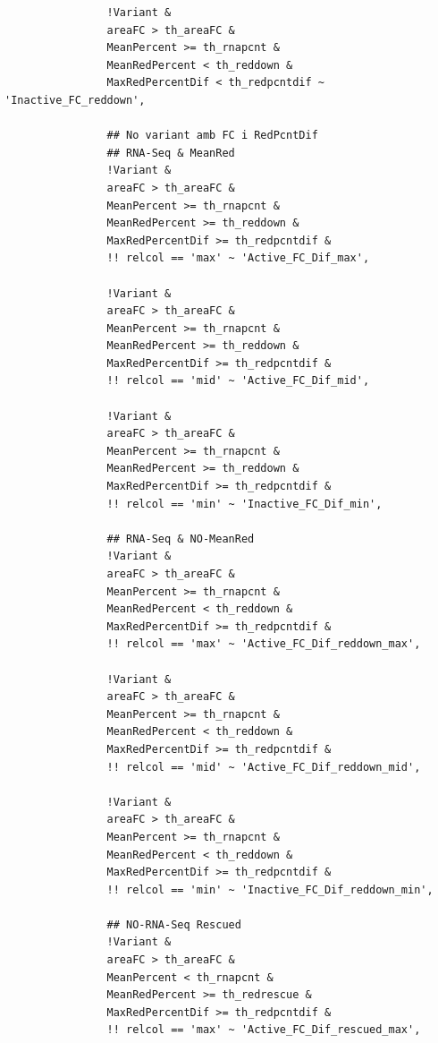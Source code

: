 \documentclass[11pt]{article}
\begin{document}
\begin{verbatim}
                !Variant &
                areaFC > th_areaFC &
                MeanPercent >= th_rnapcnt &
                MeanRedPercent < th_reddown &
                MaxRedPercentDif < th_redpcntdif ~ 'Inactive_FC_reddown',

                ## No variant amb FC i RedPcntDif
                ## RNA-Seq & MeanRed
                !Variant &
                areaFC > th_areaFC &
                MeanPercent >= th_rnapcnt &
                MeanRedPercent >= th_reddown &
                MaxRedPercentDif >= th_redpcntdif &
                !! relcol == 'max' ~ 'Active_FC_Dif_max',

                !Variant &
                areaFC > th_areaFC &
                MeanPercent >= th_rnapcnt &
                MeanRedPercent >= th_reddown &
                MaxRedPercentDif >= th_redpcntdif &
                !! relcol == 'mid' ~ 'Active_FC_Dif_mid',

                !Variant &
                areaFC > th_areaFC &
                MeanPercent >= th_rnapcnt &
                MeanRedPercent >= th_reddown &
                MaxRedPercentDif >= th_redpcntdif &
                !! relcol == 'min' ~ 'Inactive_FC_Dif_min',

                ## RNA-Seq & NO-MeanRed
                !Variant &
                areaFC > th_areaFC &
                MeanPercent >= th_rnapcnt &
                MeanRedPercent < th_reddown &
                MaxRedPercentDif >= th_redpcntdif &
                !! relcol == 'max' ~ 'Active_FC_Dif_reddown_max',

                !Variant &
                areaFC > th_areaFC &
                MeanPercent >= th_rnapcnt &
                MeanRedPercent < th_reddown &
                MaxRedPercentDif >= th_redpcntdif &
                !! relcol == 'mid' ~ 'Active_FC_Dif_reddown_mid',

                !Variant &
                areaFC > th_areaFC &
                MeanPercent >= th_rnapcnt &
                MeanRedPercent < th_reddown &
                MaxRedPercentDif >= th_redpcntdif &
                !! relcol == 'min' ~ 'Inactive_FC_Dif_reddown_min',

                ## NO-RNA-Seq Rescued
                !Variant &
                areaFC > th_areaFC &
                MeanPercent < th_rnapcnt &
                MeanRedPercent >= th_redrescue &
                MaxRedPercentDif >= th_redpcntdif &
                !! relcol == 'max' ~ 'Active_FC_Dif_rescued_max',


\end{verbatim}
\end{document}
